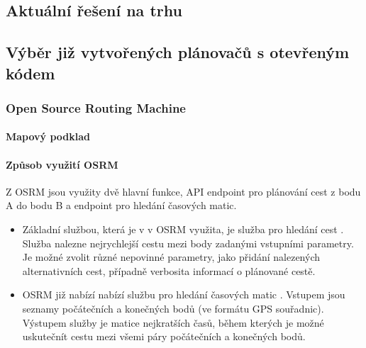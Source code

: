 \documentclass[thesis=M,czech]{FITthesis}[2019/12/23]
\theoremstyle{plain}
\theoremstyle{definition}
\begin{document}
\subsection{Aktuální řešení na trhu}











\subsection{Výběr již vytvořených plánovačů s otevřeným kódem}

\subsubsection{Open Source Routing Machine}



\paragraph{Mapový podklad}



\paragraph{Způsob využití OSRM}

Z OSRM jsou využity dvě hlavní funkce, API endpoint pro plánování cest z bodu A do bodu B a endpoint pro hledání časových matic.




\begin{itemize}
	\item Základní službou, která je v v OSRM využita, je služba pro hledání cest \cite{osrm-route-api}.  Služba nalezne nejrychlejší cestu mezi body zadanými vstupními parametry. Je možné zvolit různé nepovinné parametry, jako přidání nalezených alternativních cest, případně verbosita informací o plánované cestě.

	\item OSRM již nabízí nabízí službu pro hledání časových matic \cite{osrm-table-api}. Vstupem jsou seznamy počátečních a konečných bodů (ve formátu GPS souřadnic). Výstupem služby je matice nejkratších časů, během kterých je možné uskutečnít cestu mezi všemi páry počátečních a konečných bodů. \label{osrm-time-matrix}

\end{itemize}
\end{document}
